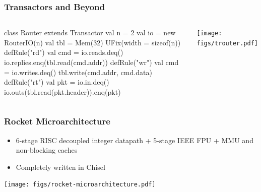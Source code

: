 \documentclass[xcolor=pdflatex,dvipsnames,table]{beamer}
\begin{document}
\begin{frame}[fragile]
\frametitle{Transactors and Beyond}
\begin{columns}
{
\begin{scala}
class Router extends Transactor {
  val n   = 2
  val io  = new RouterIO(n)
  val tbl = Mem(32){ UFix(width = sizeof(n)) }
  defRule("rd") { 
    val cmd = io.reads.deq()  
    io.replies.enq(tbl.read(cmd.addr)) 
  }
  defRule("wr") { 
    val cmd = io.writes.deq()
    tbl.write(cmd.addr, cmd.data) 
  }
  defRule("rt") { 
    val pkt = io.in.deq()
    io.outs(tbl.read(pkt.header)).enq(pkt) 
  }
}
\end{scala}
}
\texttt{[image: figs/trouter.pdf]} 
\end{columns}

\end{frame}

% 
% 

\begin{frame}[fragile]
\frametitle{Rocket Microarchitecture}
\begin{itemize}
\item 6-stage RISC decoupled integer datapath + 5-stage IEEE FPU + MMU
  and non-blocking caches
\item Completely written in Chisel
\end{itemize}
\texttt{[image: figs/rocket-microarchitecture.pdf]}

\end{frame}
\end{document}
